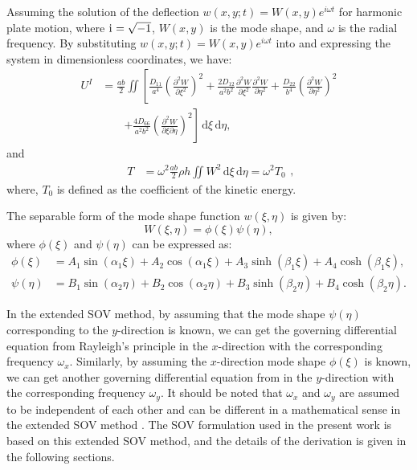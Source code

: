\documentclass[preprint,12pt,number]{elsarticle}
\newcommand{\ii}{\mathrm{i}\mkern1mu}
\begin{document}
Assuming the solution of the deflection $ w(x, y; t) = W(x, y) e^{i \omega t} $ for harmonic plate motion, 
where $ \ii = \sqrt{-1} $, $ W(x, y) $ is the mode shape, and $ \omega $ is the radial frequency.  
By substituting $ w(x, y; t) = W(x, y) e^{i \omega t} $ into  and expressing the system in dimensionless coordinates, we have:
%
\begin{equation}\label{eq:poten_energy_mag}
\begin{split}
	U^{I} &= \frac{ab}{2} \iint \left[ \frac{D_{11}}{a^4} \left( \frac{\partial^2 W}{\partial \xi^2} \right)^2 + \frac{2 D_{12}}{a^2 b^2} \frac{\partial^2 W}{\partial \xi^2} \frac{\partial^2 W}{\partial \eta^2} + \frac{D_{22}}{b^4} \left( \frac{\partial^2 W}{\partial \eta^2} \right)^2 \right. \\
	&\qquad \left. + \frac{4 D_{66}}{a^2 b^2} \left( \frac{\partial^2 W}{\partial \xi \partial \eta} \right)^2 \right] \, \mathrm{d} \xi \, \mathrm{d} \eta,
\end{split}
\end{equation}
%
and
%
\begin{equation}\label{eq:kine_energy_mag}
\begin{split}
	T &= \omega^2 \frac{ab}{2} \rho h \iint W^2 \, \mathrm{d} \xi \, \mathrm{d} \eta=\omega^2T_0
\end{split},
\end{equation}
%
where, $T_0$ is defined as the coefficient of the kinetic energy.

The separable form of the mode shape function $ w(\xi, \eta)$ is given by:
%
\begin{equation}\label{eq:displace_func}
W(\xi, \eta) = \phi(\xi) \psi(\eta),
\end{equation}
%
where $ \phi(\xi) $ and $\psi(\eta) $ can be expressed as:
\begin{subequations}\label{eq:phi_psi_solution}
\begin{align}
	\phi(\xi) &= A_1 \sin{(\alpha_1 \xi)} + A_2 \cos{(\alpha_1 \xi)} + A_3 \sinh{(\beta_1 \xi)} + A_4 \cosh{(\beta_1 \xi)},\label{eq:phi_solution1}\\
	\psi(\eta) &= B_1 \sin{(\alpha_2 \eta)} + B_2 \cos{(\alpha_2 \eta)} + B_3 \sinh{(\beta_2 \eta)} + B_4 \cosh{(\beta_2 \eta)}. \label{eq:phi_solution2}
\end{align}
\end{subequations}

In the extended SOV method, by assuming that the mode shape $\psi(\eta)$ corresponding to the $y$-direction is known, we can get the governing differential equation from Rayleigh's principle  in the $x$-direction with the corresponding frequency $\omega_x$.
Similarly, by assuming the $x$-direction mode shape $\phi(\xi)$ is known, we can get another governing differential equation from  in the $y$-direction with the corresponding frequency $\omega_y$.
It should be noted that $\omega_x$ and $\omega_y$ are assumed to be independent of each other and can be different in a mathematical sense in the extended SOV method \citep{xing2020extended}. 
The SOV formulation used in the present work is based on this extended SOV method, and the details of the derivation is given in the following sections.
\end{document}
